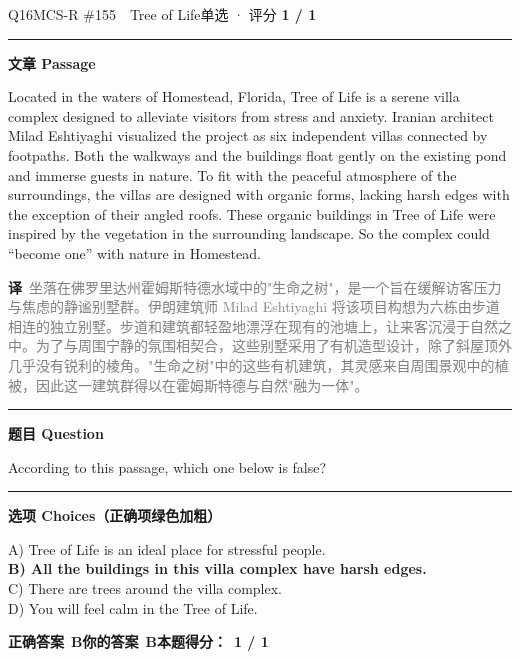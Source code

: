 \documentclass[11pt]{article}
\newcommand{\ptesub}[1]{%
  \par\needspace{2\baselineskip}\smallskip
  {\color{cAccent}\rule[-0.2ex]{3pt}{1.05em}}\hspace{6pt}%
  {\bfseries\color{cHead}#1}\par\nopagebreak\smallskip}
\newcommand{\zh}[1]{{\footnotesize\textcolor{cNote}{\textbf{译}}\ \textcolor{gray}{#1}}}
\begin{document}
\begin{qblock}{Q16\quad MCS-R \#155\ \ Tree of Life}{单选 · 评分 \textcolor{cAccent}{\bfseries 1 / 1}}
\ptesub{文章 Passage}
\begin{promptbox}
Located in the waters of Homestead, Florida, Tree of Life is a serene villa complex designed to alleviate visitors from stress and anxiety. Iranian architect Milad Eshtiyaghi visualized the project as six independent villas connected by footpaths. Both the walkways and the buildings float gently on the existing pond and immerse guests in nature. To fit with the peaceful atmosphere of the surroundings, the villas are designed with organic forms, lacking harsh edges with the exception of their angled roofs. These organic buildings in Tree of Life were inspired by the vegetation in the surrounding landscape. So the complex could ``become one'' with nature in Homestead.
\end{promptbox}
\zh{坐落在佛罗里达州霍姆斯特德水域中的"生命之树"，是一个旨在缓解访客压力与焦虑的静谧别墅群。伊朗建筑师 Milad Eshtiyaghi 将该项目构想为六栋由步道相连的独立别墅。步道和建筑都轻盈地漂浮在现有的池塘上，让来客沉浸于自然之中。为了与周围宁静的氛围相契合，这些别墅采用了有机造型设计，除了斜屋顶外几乎没有锐利的棱角。"生命之树"中的这些有机建筑，其灵感来自周围景观中的植被，因此这一建筑群得以在霍姆斯特德与自然"融为一体"。}
\ptesub{题目 Question}
\begin{notebox}According to this passage, which one below is false?\end{notebox}
\ptesub{选项 Choices（正确项绿色加粗）}
{\small
A) Tree of Life is an ideal place for stressful people.\\
{\color{cFix}\textbf{B) All the buildings in this villa complex have harsh edges.}}\\
C) There are trees around the villa complex.\\
D) You will feel calm in the Tree of Life.}
\par\smallskip
\textbf{正确答案}\ \textcolor{cFix}{\bfseries B}\qquad\textbf{你的答案}\ \textcolor{cFix}{\bfseries B}\qquad\textbf{本题得分：}\ {\color{cAccent}\bfseries 1 / 1}
\end{qblock}
\end{document}
